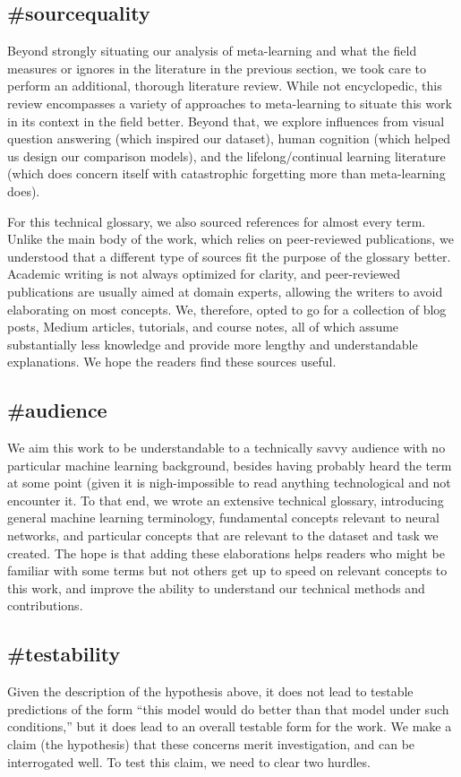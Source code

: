 \subsection{\#sourcequality}
Beyond strongly situating our analysis of meta-learning and what the field measures or ignores in the literature in the previous section, we took care to perform an additional, thorough literature review. While not encyclopedic, this review encompasses a variety of approaches to meta-learning to situate this work in its context in the field better. Beyond that, we explore influences from visual question answering (which inspired our dataset), human cognition (which helped us design our comparison models), and the lifelong/continual learning literature (which does concern itself with catastrophic forgetting more than meta-learning does).

For this technical glossary, we also sourced references for almost every term. Unlike the main body of the work, which relies on peer-reviewed publications, we understood that a different type of sources fit the purpose of the glossary better. Academic writing is not always optimized for clarity, and peer-reviewed publications are usually aimed at domain experts, allowing the writers to avoid elaborating on most concepts. We, therefore, opted to go for a collection of blog posts, Medium articles, tutorials, and course notes, all of which assume substantially less knowledge and provide more lengthy and understandable explanations. We hope the readers find these sources useful.

\subsection{\#audience}
We aim this work to be understandable to a technically savvy audience with no particular machine learning background, besides having probably heard the term at some point (given it is nigh-impossible to read anything technological and not encounter it. To that end, we wrote an extensive technical glossary, introducing general machine learning terminology, fundamental concepts relevant to neural networks, and particular concepts that are relevant to the dataset and task we created. The hope is that adding these elaborations helps readers who might be familiar with some terms but not others get up to speed on relevant concepts to this work, and improve the ability to understand our technical methods and contributions.

\subsection{\#testability}
Given the description of the hypothesis above, it does not lead to testable predictions of the form ``this model would do better than that model under such conditions,'' but it does lead to an overall testable form for the work. We make a claim (the hypothesis) that these concerns merit investigation, and can be interrogated well. To test this claim, we need to clear two hurdles. 

